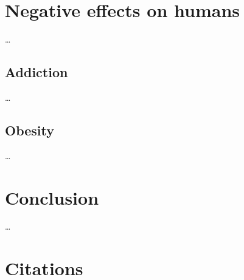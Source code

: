\documentclass[10pt,twoside,english,a4paper]{article}
\begin{document}
\section{Negative effects on humans}
\ldots

\subsection{Addiction}
\ldots

\subsection{Obesity}
\ldots

\section{Conclusion} \label{conclusion}
\ldots

\section*{Citations} \label{cit}
~\cite{school,behavior,empathy,problems,poz-neg-sol,language,learning}




\end{document}
